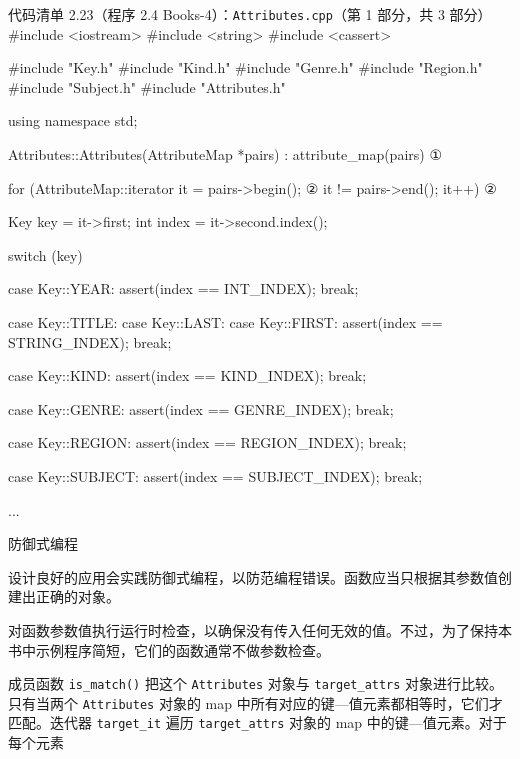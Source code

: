 \begin{codeboxt}{代码清单 2.23（程序 2.4 Books-4）：\texttt{Attributes.\allowbreak{}cpp}（第 1 部分，共 3 部分）}
#include <iostream>
#include <string>
#include <cassert>

#include "Key.h"
#include "Kind.h"
#include "Genre.h"
#include "Region.h"
#include "Subject.h"
#include "Attributes.h"

using namespace std;

Attributes::Attributes(AttributeMap *pairs) : attribute_map(pairs)  ①
{
    for (AttributeMap::iterator it = pairs->begin();                ②
         it != pairs->end(); it++)                                  ②
    {
        Key key   = it->first;
        int index = it->second.index();

        switch (key)
        {
            case Key::YEAR:
                assert(index == INT_INDEX); break;

            case Key::TITLE:
            case Key::LAST:
            case Key::FIRST:
                assert(index == STRING_INDEX); break;

            case Key::KIND:
                assert(index == KIND_INDEX); break;

            case Key::GENRE:
                assert(index == GENRE_INDEX); break;

            case Key::REGION:
                assert(index == REGION_INDEX); break;

            case Key::SUBJECT:
                assert(index == SUBJECT_INDEX); break;
        }
    }
}
...
\end{codeboxt}
\par
{}\par

\begin{mySidebar}{防御式编程}

设计良好的应用会实践防御式编程，以防范编程错误。函数应当只根据其参数值创建出正确的对象。

对函数参数值执行运行时检查，以确保没有传入任何无效的值。不过，为了保持本书中示例程序简短，它们的函数通常不做参数检查。
\end{mySidebar}

成员函数 \texttt{is\_\allowbreak{}match(\allowbreak{})\allowbreak{}} 把这个 \texttt{Attributes} 对象与 \texttt{target\_\allowbreak{}attrs} 对象进行比较。只有当两个 \texttt{Attributes} 对象的 map 中所有对应的键—值元素都相等时，它们才匹配。迭代器 \texttt{target\_\allowbreak{}it} 遍历 \texttt{target\_\allowbreak{}attrs} 对象的 map 中的键—值元素。对于每个元素

